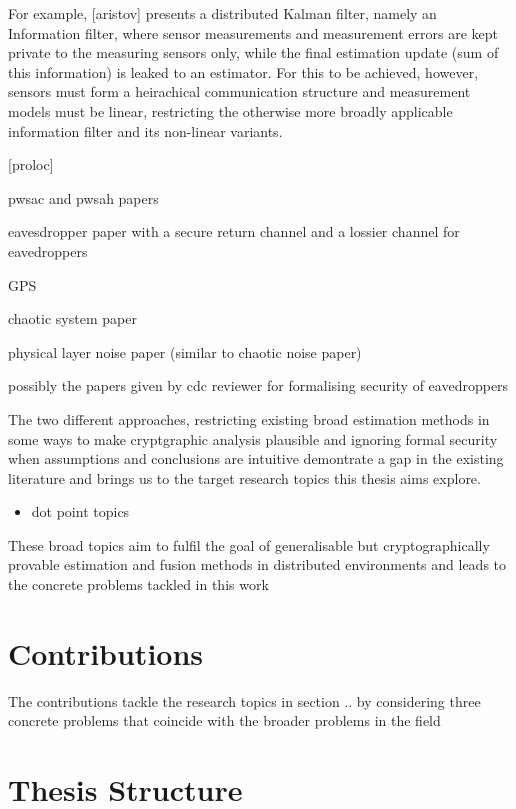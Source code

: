 For example, [aristov] presents a distributed Kalman filter, namely an Information filter, where sensor measurements and measurement errors are kept private to the measuring sensors only, while the final estimation update (sum of this information) is leaked to an estimator. For this to be achieved, however, sensors must form a heirachical communication structure and measurement models must be linear, restricting the otherwise more broadly applicable information filter and its non-linear variants.

[proloc]

pwsac and pwsah papers


eavesdropper paper with a secure return channel and a lossier channel for eavedroppers

GPS

chaotic system paper

physical layer noise paper (similar to chaotic noise paper)



possibly the papers given by cdc reviewer for formalising security of eavedroppers


The two different approaches, restricting existing broad estimation methods in some ways to make cryptgraphic analysis plausible and ignoring formal security when assumptions and conclusions are intuitive demontrate a gap in the existing literature and brings us to the target research topics this thesis aims explore.

\begin{itemize}
    \item dot point topics
\end{itemize}

These broad topics aim to fulfil the goal of generalisable but cryptographically provable estimation and fusion methods in distributed environments and leads to the concrete problems tackled in this work

\section{Contributions}

The contributions tackle the research topics in section .. by considering three concrete problems that coincide with the broader problems in the field



\section{Thesis Structure}